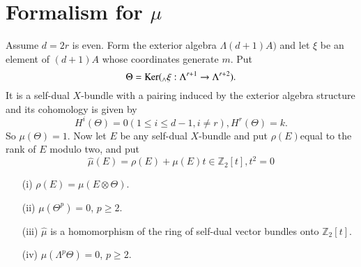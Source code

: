 \section{Formalism for \texorpdfstring{$\mu$}{mu}}\label{chap7-sec4}

Assume $d=2r$ is even. Form the exterior algebra $\Lambda (d+1)A)$ and
let $\xi$ be an element of $(d+1)A$ whose coordinates generate
$m$. Put
$$
\Theta=\operatorname{Ker} ({}_{\wedge}\xi:\Lambda^{r+1}\to \Lambda^{r+2}).
$$
It is a self-dual $X$-bundle with a pairing induced by the exterior
algebra structure and its cohomology is given by
$$
H^{i}(\Theta)=0(1\leq i\leq d-1, i\neq r), H^{r}(\Theta)=k.
$$
So $\mu(\Theta)=1$. Now let $E$ be any self-dual $X$-bundle and put
$\rho(E)$\pageoriginale equal to the rank of $E$ modulo two, and put
$$
\widehat{\mu}(E)=\rho(E)+\mu(E)t\in \mathbb{Z}_{2}[t],t^{2}=0
$$

\begin{theorem}\label{chap7-thm4.1}
\begin{itemize}
\item[\rm(i)] $\rho(E)=\mu(E\otimes \Theta)$.

\item[\rm(ii)] $\mu(\Theta^{p})=0$, $p\geq 2$.

\item[\rm(iii)] $\widehat{\mu}$ is a homomorphism of the ring of
self-dual vector bundles onto $\mathbb{Z}_{2}[t]$.

\item[\rm(iv)] $\mu(\Lambda^{p}\Theta)=0$, $p\geq 2$.
\end{itemize}
\end{theorem}

